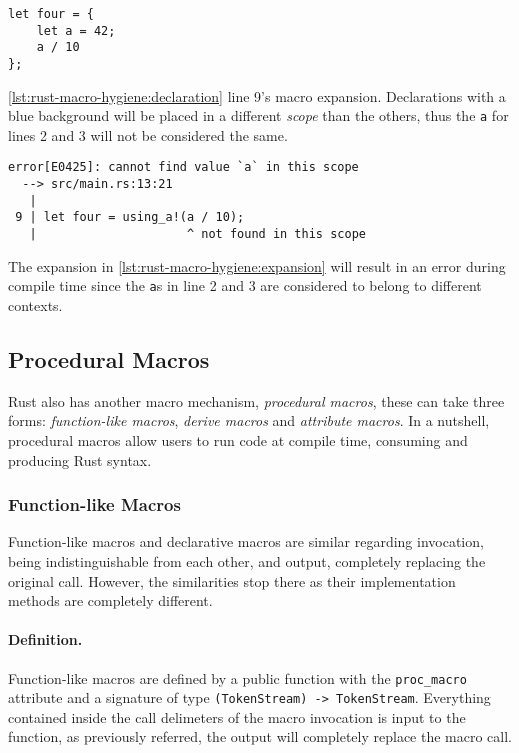 \begin{listing}
    \begin{verbatim}
let four = {
    let a = 42;
    a / 10
};
    \end{verbatim}
    \caption{
        \autoref{lst:rust-macro-hygiene:declaration} line 9's macro expansion.
        Declarations with a blue background will be placed in a different \emph{scope} than the others,
        thus the \texttt{a} for lines 2 and 3 will not be considered the same.
    }
    \label{lst:rust-macro-hygiene:expansion}
\end{listing}

\begin{listing}
    \begin{verbatim}
error[E0425]: cannot find value `a` in this scope
  --> src/main.rs:13:21
   |
 9 | let four = using_a!(a / 10);
   |                     ^ not found in this scope
    \end{verbatim}
    \caption{
        The expansion in \autoref{lst:rust-macro-hygiene:expansion} will result in an error during compile time
        since the \texttt{a}s in line 2 and 3 are considered to belong to different contexts.
    }
    \label{lst:rust-macro-hygiene:error}
\end{listing}

\subsection{Procedural Macros}
Rust also has another macro mechanism, \emph{procedural macros},
these can take three forms: \emph{function-like macros}, \emph{derive macros} and \emph{attribute macros}.
In a nutshell, procedural macros allow users to run code at compile time, consuming and producing Rust syntax.

\subsubsection*{Function-like Macros}
Function-like macros and declarative macros are similar regarding invocation, being indistinguishable from each other,
and output, completely replacing the original call.
However, the similarities stop there as their implementation methods are completely different.

\paragraph{Definition.}
Function-like macros are defined by a public function with the \texttt{proc\_macro} attribute and
a signature of type \texttt{(TokenStream) -> TokenStream}.
Everything contained inside the call delimeters of the macro invocation is input to the function,
as previously referred, the output will completely replace the macro call.

